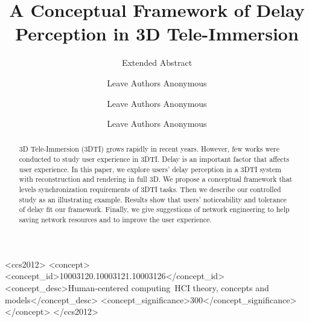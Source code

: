 \documentclass[sigchi, review]{acmart}
\begin{document}
\begin{CJK*}{UTF8}{gbsn}

\title{A Conceptual Framework of Delay Perception in 3D Tele-Immersion}

\subtitle{Extended Abstract}

\author{Leave Authors Anonymous}

\author{Leave Authors Anonymous}

\author{Leave Authors Anonymous}

\renewcommand{\shortauthors}{B. Trovato et al.}

\begin{abstract}

3D Tele-Immersion (3DTI) grows rapidly in recent years. However, few works were conducted to study user experience in 3DTI. Delay is an important factor that affects user experience. In this paper, we explore users' delay perception in a 3DTI system with reconstruction and rendering in full 3D. We propose a conceptual framework that levels synchronization requirements of 3DTI tasks. Then we describe our controlled study as an illustrating example. Results show that users' noticeability and tolerance of delay fit our framework. Finally, we give suggestions of network engineering to help saving network resources and to improve the user experience.

\end{abstract}

%
%
\begin{CCSXML}
<ccs2012>
<concept>
<concept_id>10003120.10003121.10003126</concept_id>
<concept_desc>Human-centered computing~HCI theory, concepts and models</concept_desc>
<concept_significance>300</concept_significance>
</concept>
</ccs2012>
\end{CCSXML}



\end{CJK*}
\end{document}
